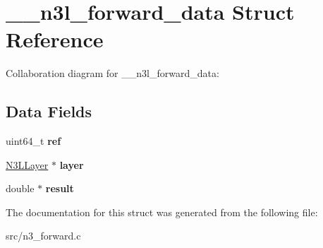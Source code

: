 \hypertarget{struct____n3l__forward__data}{}\section{\+\_\+\+\_\+n3l\+\_\+forward\+\_\+data Struct Reference}
\label{struct____n3l__forward__data}


Collaboration diagram for \+\_\+\+\_\+n3l\+\_\+forward\+\_\+data\+:
\subsection*{Data Fields}
\begin{DoxyCompactItemize}
\item 
\mbox{\label{struct____n3l__forward__data_ada78b9bd1418f8dccab76319afb7d64b}} 
uint64\+\_\+t {\bfseries ref}
\item 
\mbox{\label{struct____n3l__forward__data_aaeb45910cc54c7f3a770dbd124477fc2}} 
\mbox{\hyperlink{struct__n3l__layer}{N3\+L\+Layer}} $\ast$ {\bfseries layer}
\item 
\mbox{\label{struct____n3l__forward__data_ac870eae5ce14b297b5d78cc7112c8cec}} 
double $\ast$ {\bfseries result}
\end{DoxyCompactItemize}


The documentation for this struct was generated from the following file\+:\begin{DoxyCompactItemize}
\item 
src/n3\+\_\+forward.\+c\end{DoxyCompactItemize}
